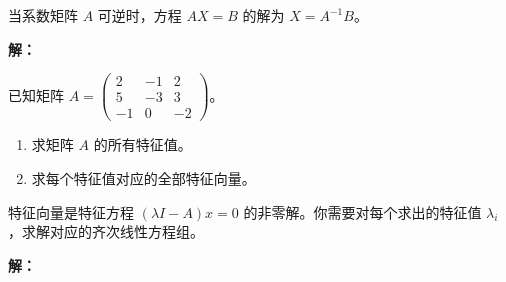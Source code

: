 \documentclass[a4paper, 12pt]{ctexart}
\begin{document}
\begin{hint}
    当系数矩阵 $A$ 可逆时，方程 $AX=B$ 的解为 $X=A^{-1}B$。
\end{hint}

\noindent\textbf{解：}

\vspace{1cm}


\begin{exercise}
    已知矩阵 $A = \begin{pmatrix} 2 & -1 & 2 \\ 5 & -3 & 3 \\ -1 & 0 & -2 \end{pmatrix}$。
    \begin{enumerate}
        \item 求矩阵 $A$ 的所有特征值。
        \item 求每个特征值对应的全部特征向量。
    \end{enumerate}
\end{exercise}

\begin{hint}
    特征向量是特征方程 $(\lambda I - A)x = 0$ 的非零解。你需要对每个求出的特征值 $\lambda_i$，求解对应的齐次线性方程组。
\end{hint}

\noindent\textbf{解：}
\end{document}
